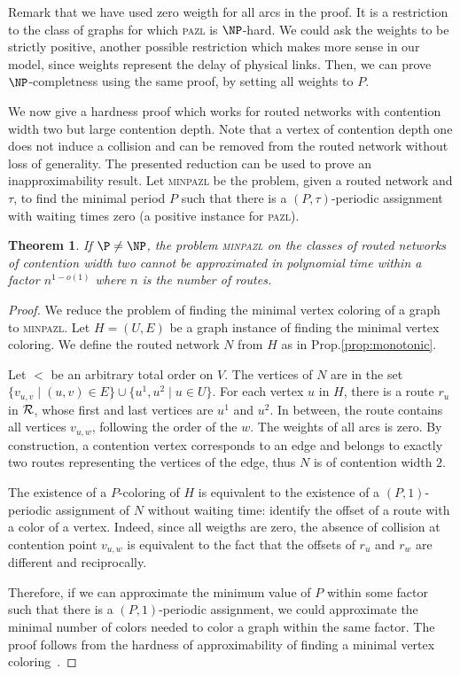 \documentclass[a4paper,10pt]{article}
\newtheorem{theorem}{Theorem}
\newcommand\pazl{\textsc{pazl}\xspace}
\newcommand\minpazl{\textsc{minpazl}\xspace}
\begin{document}
 Remark that we have used zero weigth for all arcs in the proof. It is a restriction to the 
 class of graphs for which \pazl is $\NP$-hard. We could ask the weights to be strictly positive, another possible restriction which makes more sense in our model, since weights represent the delay of physical links. Then, we can prove $\NP$-completness using the same proof, by setting all weights to $P$.


We now give a hardness proof which works for routed networks with contention width two but large contention depth. Note that a vertex of contention depth one does not induce a collision and can be removed from the routed network without loss of generality. The presented reduction can be used to prove an inapproximability result. Let \minpazl be the problem, given a routed network and $\tau$, to find the minimal period $P$ such that there is a $(P,\tau)$-periodic assignment with waiting times zero (a positive instance for \pazl). 


\begin{theorem}\label{th:inapprox}
If $\P \neq \NP$, the problem \minpazl on the classes of routed networks of contention width two cannot be approximated in polynomial time within a factor $n^{1-o(1)}$ where $n$ is the number of routes.
\end{theorem}

\begin{proof}
 We reduce the problem of finding the minimal vertex coloring of a graph to \minpazl. Let $H = (U,E)$ be a graph instance of finding the minimal vertex coloring.  We define the routed network $N$ from $H$ as in Prop.\ref{prop:monotonic}.
 
 Let $<$ be an arbitrary total order on $V$. 
 The vertices of $N$ are in the set $\{v_{u,v} \mid (u,v) \in E\} \cup \{u^1, u^2 \mid u \in U\}$. 
 For each vertex $u$ in $H$, there is a route $r_u$ in ${\cal R}$, whose first and last vertices
 are $u^1$ and $u^2$. In between, the route contains all vertices $v_{u,w}$, following the order of the $w$.
 The weights of all arcs is zero. By construction, a contention vertex corresponds to an edge and belongs to exactly two routes representing the vertices of the edge, thus $N$ is of contention width $2$.

  The existence of a $P$-coloring of $H$ is equivalent to the existence of a $(P,1)$-periodic assignment of $N$ without waiting time: identify the offset of a route with a color of a vertex. Indeed, since all weigths are zero, the absence of collision at contention point $v_{u,w}$ is equivalent to the fact that the offsets of $r_u$ and $r_w$ are different and reciprocally.

   Therefore, if we can approximate the minimum value of $P$ within some factor such that there is a $(P,1)$-periodic assignment, we could approximate the minimal number of colors needed to color a graph within the same factor. The proof follows from the hardness of approximability of finding a minimal vertex coloring~\cite{zuckerman2006linear}.
\end{proof}
\end{document}
